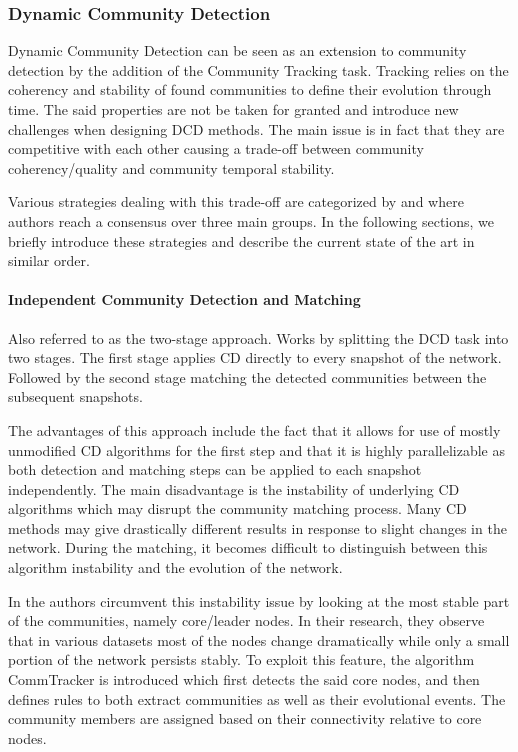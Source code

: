 \documentclass[
acmsmall,
nonacm,
screen,
acmthm]{../../scripts/pandoc/templates/acmart}
\begin{document}
\hypertarget{dynamic-community-detection}{%
\subsubsection{Dynamic Community
Detection}\label{dynamic-community-detection}}

Dynamic Community Detection can be seen as an extension to community
detection by the addition of the Community Tracking task. Tracking
relies on the coherency and stability of found communities to define
their evolution through time. The said properties are not be taken for
granted and introduce new challenges when designing DCD methods. The
main issue is in fact that they are competitive with each other causing
a trade-off between community coherency/quality and community temporal
stability.

Various strategies dealing with this trade-off are categorized by
\citet{rossettiCommunityDiscoveryDynamic2018} and
\citet{dakicheTrackingCommunityEvolution2019} where authors reach a
consensus over three main groups. In the following sections, we briefly
introduce these strategies and describe the current state of the art in
similar order.

\hypertarget{independent-community-detection-and-matching}{%
\paragraph{Independent Community Detection and
Matching}\label{independent-community-detection-and-matching}}

Also referred to as the two-stage approach. Works by splitting the DCD
task into two stages. The first stage applies CD directly to every
snapshot of the network. Followed by the second stage matching the
detected communities between the subsequent snapshots.

The advantages of this approach include the fact that it allows for use
of mostly unmodified CD algorithms for the first step and that it is
highly parallelizable as both detection and matching steps can be
applied to each snapshot independently. The main disadvantage is the
instability of underlying CD algorithms which may disrupt the community
matching process. Many CD methods may give drastically different results
in response to slight changes in the network. During the matching, it
becomes difficult to distinguish between this algorithm instability and
the evolution of the network.

In \citet{wangCommunityEvolutionSocial2008} the authors circumvent this
instability issue by looking at the most stable part of the communities,
namely core/leader nodes. In their research, they observe that in
various datasets most of the nodes change dramatically while only a
small portion of the network persists stably. To exploit this feature,
the algorithm CommTracker is introduced which first detects the said
core nodes, and then defines rules to both extract communities as well
as their evolutional events. The community members are assigned based on
their connectivity relative to core nodes.
\end{document}
